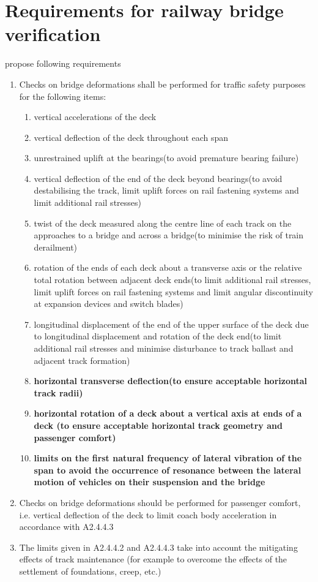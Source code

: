 \section{Requirements for railway bridge verification}
\cite{EC0} propose following requirements


\begin{enumerate}
	\item Checks on bridge deformations shall be performed for traffic safety purposes for the following items:
	\begin{enumerate}[-]
		\item vertical accelerations of the deck
		\item vertical deflection of the deck throughout each span
		\item unrestrained uplift at the bearings(to avoid premature bearing failure)
		\item vertical deflection of the end of the deck beyond bearings(to avoid destabilising the track, limit uplift forces on rail fastening systems and limit additional rail stresses) 
		\item twist of the deck measured along the centre line of each track on the approaches to a bridge and across a bridge(to minimise the risk of train derailment)
		\item rotation of the ends of each deck about a transverse axis or the relative total rotation between adjacent deck ends(to limit additional rail stresses, limit uplift forces on rail fastening systems and limit angular discontinuity at expansion devices and switch blades)
		\item longitudinal displacement of the end of the upper surface of the deck due to longitudinal displacement and rotation of the deck end(to limit additional rail stresses and minimise disturbance to track ballast and adjacent track formation)
		\item \textbf{horizontal transverse deflection(to ensure acceptable horizontal track radii)}
		\item \textbf{horizontal rotation of a deck about a vertical axis at ends of a deck (to ensure acceptable horizontal track geometry and passenger comfort)}
		\item \textbf{limits on the first natural frequency of lateral vibration of the span to avoid the occurrence of resonance between the lateral motion of vehicles on their suspension and the bridge}
	\end{enumerate}
	\item Checks on bridge deformations should be performed for passenger comfort, i.e. vertical deflection of the deck to limit coach body acceleration in accordance with A2.4.4.3\cite{EC0}
	\item The limits given in A2.4.4.2 and A2.4.4.3\cite{EC0} take into account the mitigating effects of track maintenance (for example to overcome the effects of the settlement of foundations, creep, etc.) 
\end{enumerate}


